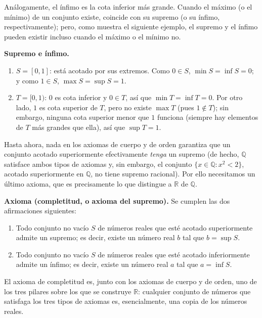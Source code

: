 \documentclass[12pt,a4paper]{book}
\begin{document}
  Análogamente, el ínfimo es la cota inferior más grande. Cuando el máximo (o el mínimo) de un conjunto existe, coincide con su supremo (o su ínfimo, respectivamente); pero, como muestra el siguiente ejemplo, el supremo y el ínfimo pueden existir incluso cuando el máximo o el mínimo no.
  
  \begin{ejemplo}
    \textbf{Supremo e ínfimo.}
    \begin{enumerate}[label=(\arabic*)]
      \item $S=[0,1]$: está acotado por sus extremos. Como $0\in S$, $\min S = \inf S = 0$; y como $1\in S$, $\max S = \sup S = 1$.
      \item $T=[0,1)$: $0$ es cota inferior y $0\in T$, así que $\min T = \inf T = 0$. Por otro lado, $1$ es cota superior de $T$, pero no existe $\max T$ (pues $1\notin T$); sin embargo, ninguna cota superior menor que $1$ funciona (siempre hay elementos de $T$ más grandes que ella), así que $\sup T = 1$.
    \end{enumerate}
  \end{ejemplo}
  
  Hasta ahora, nada en los axiomas de cuerpo y de orden garantiza que un conjunto acotado superiormente efectivamente \emph{tenga} un supremo (de hecho, $\mathbb{Q}$ satisface ambos tipos de axiomas y, sin embargo, el conjunto $\{x\in\mathbb{Q} : x^2<2\}$, acotado superiormente en $\mathbb{Q}$, no tiene supremo racional). Por ello necesitamos un último axioma, que es precisamente lo que distingue a $\mathbb{R}$ de $\mathbb{Q}$.
  
  \noindent\textbf{Axioma (completitud, o axioma del supremo).} Se cumplen las dos afirmaciones siguientes:
  \begin{enumerate}[label=(\alph*)]
    \item Todo conjunto no vacío $S$ de números reales que esté acotado superiormente admite un supremo; es decir, existe un número real $b$ tal que $b=\sup S$.
    \item Todo conjunto no vacío $S$ de números reales que esté acotado inferiormente admite un ínfimo; es decir, existe un número real $a$ tal que $a=\inf S$.
  \end{enumerate}
  
  El axioma de completitud es, junto con los axiomas de cuerpo y de orden, uno de los tres pilares sobre los que se construye $\mathbb{R}$: cualquier conjunto de números que satisfaga los tres tipos de axiomas es, esencialmente, una copia de los números reales.
  
\end{document}
